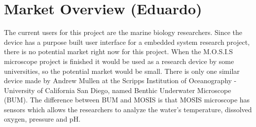 \section{Market Overview (Eduardo)}
The current users for this project are the marine biology researchers. Since the device has a purpose built user interface for a embedded system research project, there is no potential market right now for this project. When the M.O.S.I.S microscope project is finished it would be used as a research device by some universities, so the potential market would be small. There is only one similar device made by Andrew Mullen at the Scripps Institution of Oceanography - University of California San Diego, named Benthic Underwater Microscope (BUM). The difference between BUM and MOSIS is that MOSIS microscope has sensors which allows the researchers to analyze the water's temperature, dissolved oxygen, pressure and pH.
